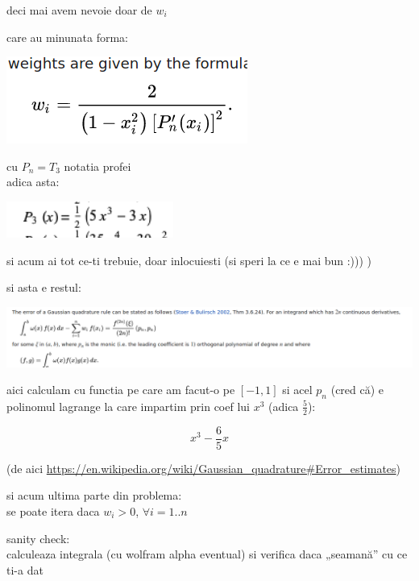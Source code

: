 \documentclass[11pt]{article}
\begin{document}
deci mai avem nevoie doar de \(w_i\)
\medskip

care au minunata forma:

\begin{center}
\includegraphics[width=.4\linewidth]{./w_i.png}
\end{center}

cu \(P_n = T_3\) notatia profei\\
adica asta:

\begin{center}
\includegraphics[width=.4\linewidth]{./lagrange3.png}
\end{center}

si acum ai tot ce-ti trebuie, doar inlocuiesti
(si speri la ce e mai bun :))) )
\medskip

si asta e restul:

\begin{center}
\includegraphics[width=\linewidth]{./rest.png}
\end{center}

aici calculam cu functia pe care am facut-o pe \([-1, 1]\)
si acel \(p_n\) (cred că) e polinomul lagrange la care impartim prin coef lui \(x^3\) (adica \(\frac{5}{2}\)):

\[x^3 - \frac{6}{5} x\]

(de aici
\url{https://en.wikipedia.org/wiki/Gaussian\_quadrature\#Error\_estimates})

\medskip

si acum ultima parte din problema:\\
se poate itera daca \(w_i > 0\), \(\forall i = 1..n\)
\medskip

sanity check:\\
calculeaza integrala (cu wolfram alpha eventual) si verifica daca „seamană” cu ce ti-a dat
\end{document}
